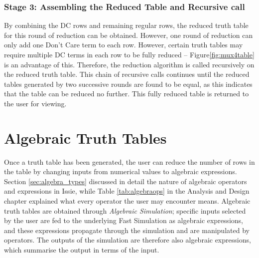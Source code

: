 \subsubsection{Stage 3: Assembling the Reduced Table and Recursive call}
By combining the DC rows and remaining regular rows, the reduced truth table for this round of reduction can be obtained. However, one round of reduction can only add one Don't Care term to each row. However, certain truth tables may require multiple DC terms in each row to be fully reduced -- Figure\ref{fig:mux4table} is an advantage of this. Therefore, the reduction algorithm is called recursively on the reduced truth table. This chain of recursive calls continues until the reduced tables generated by two successive rounds are found to be equal, as this indicates that the table can be reduced no further. This fully reduced table is returned to the user for viewing.

\newpage

\section{Algebraic Truth Tables}
Once a truth table has been generated, the user can reduce the number of rows in the table by changing inputs from numerical values to algebraic expressions. Section \ref{sec:algebra_types} discussed in detail the nature of algebraic operators and expressions in Issie, while Table \ref{tab:algebraops} in the Analysis and Design chapter explained what every operator the user may encounter means. Algebraic truth tables are obtained through \textit{Algebraic Simulation}; specific inputs selected by the user are fed to the underlying Fast Simulation as  algebraic expressions, and these expressions propagate through the simulation and are manipulated by operators. The outputs of the simulation are therefore also algebraic expressions, which summarise the output in terms of the input. 


